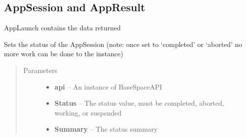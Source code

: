 \documentclass[letterpaper,10pt,english]{sphinxmanual}
\begin{document}
\subsection{AppSession and AppResult}
\label{Available modules:appsession-and-appresult}

\begin{fulllineitems}
\label{Available modules:BaseSpacePy.model.AppSession.AppSession}
AppLaunch contains the data returned

\begin{fulllineitems}
\label{Available modules:BaseSpacePy.model.AppSession.AppSession.setStatus}
Sets the status of the AppSession (note: once set to `completed' or `aborted' no more work can be done to the instance)
\begin{quote}\begin{description}
\item[{Parameters}] \leavevmode\begin{itemize}
\item {} 
\textbf{api} -- An instance of BaseSpaceAPI

\item {} 
\textbf{Status} -- The status value, must be completed, aborted, working, or suspended

\item {} 
\textbf{Summary} -- The status summary

\end{itemize}

\end{description}\end{quote}

\end{fulllineitems}


\end{fulllineitems}

\end{document}
